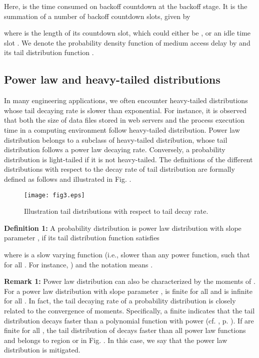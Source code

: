 \documentclass[journal]{IEEEtran}
\begin{document}
Here,  is the time consumed on backoff countdown at the  backoff stage. It is the summation of a number of backoff countdown slots, given by

where  is the length of its  countdown slot, which could either be ,  or an idle time slot . We denote the probability density function of medium access delay  by  and its tail distribution function .

\subsection{Power law and heavy-tailed distributions}
In many engineering applications, we often encounter heavy-tailed distributions whose tail decaying rate is slower than exponential\cite{2003:Asmussen}. For instance, it is observed that both the size of data files stored in web servers and the process execution time in a computing environment follow heavy-tailed distribution\cite{2001:Crovella}. Power law distribution belongs to a subclass of heavy-tailed distribution, whose tail distribution follows a power law decaying rate. Conversely, a probability distribution is light-tailed if it is not heavy-tailed. The definitions of the different distributions with respect to the decay rate of tail distribution are formally defined as follows and illustrated in Fig. .

\begin{figure}
\centering
  \begin{center}
    \texttt{[image: fig3.eps]}
  \end{center}
  \caption{Illustration tail distributions with respect to tail decay rate.}
  \label{53}
\end{figure}

\textbf{Definition 1:} A probability distribution  is power law distribution with slope parameter , if its tail distribution function  satisfies

where  is a slow varying function (i.e., slower than any power function, such that  for all . For instance, ) and the notation  means .

\textbf{Remark 1:} Power law distribution can also be characterized by the moments of . For a power law distribution with slope parameter ,  is finite for all  and is infinite for all  \cite{2009:Cho}. In fact, the tail decaying rate of a probability distribution is closely related to the convergence of moments. Specifically, a finite  indicates that the tail distribution decays faster than a polynomial function with power  (cf. \cite{2005:Gut}, p. ). If  are finite for all , the tail distribution of  decays faster than all power law functions and  belongs to region  or  in Fig. . In this case, we say that the power law distribution is mitigated.
\end{document}
